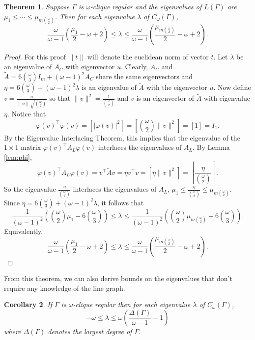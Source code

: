 \documentclass[12pt]{report}
\newtheorem{thm}{Theorem}[chapter]
\newtheorem{cor}[thm]{Corollary}
\theoremstyle{definition}
\begin{document}
\begin{thm} \label{thm:bounds}
    Suppose $\Gamma$ is $\omega$-clique regular and the eigenvalues of $L(\Gamma)$ are $\mu_1 \leq \cdots \leq \mu_{m\binom{\omega}{2}}$. Then for each eigenvalue $\lambda$ of $C_\omega(\Gamma)$,
    \[\frac{\omega}{\omega - 1}\left(\frac{\mu_1}{2} -\omega +2\right) \leq \lambda \leq \frac{\omega}{\omega - 1}\left(\frac{\mu_{m\binom{\omega}{2}}}{2} -\omega +2\right).\]
\end{thm}
\begin{proof}
    For this proof $\|t\|$ will denote the euclidean norm of vector $t$. Let $\lambda$ be an eigenvalue of $A_C$ with eigenvector $u$. Clearly, $A_C$ and $\tilde{A} = 6\binom{\omega}{3}I_{m} + (\omega -1)^2A_C$ share the same eigenvectors and $\eta= 6\binom{\omega}{3}+(\omega-1)^2\lambda$ is an eigenvalue of $\tilde{A}$ with the eigenvector $u$. Now define $v = \frac{u}{\|u\|\sqrt{\binom{\omega}{2}}}$ so that $\|v\|^2=\frac{1}{\binom{\omega}{2}}$ and $v$ is an eigenvector of $\tilde{A}$ with eigenvalue $\eta$. Notice that 
    \[\varphi(v)^\top \varphi(v)=\left[|\varphi(v)|^2\right]=\left[\binom{\omega}{2}\|v\|^2\right]=[1]=I_1.\]
    By the Eigenvalue Interlacing Theorem, \cite[pg. 26]{haemers} this implies that the eigenvalue of the $1 \times 1$ matrix $\varphi(v)^\top  A_L \varphi(v)$ interlaces the eigenvalues of $A_L$. By Lemma \ref{lem:phi}, 
    \[\varphi(v)^\top  A_L \varphi(v)  = v^\top  \tilde{A}v = \eta v^\top  v =\left[\eta\|v\|^2\right]=\left[\frac{\eta}{\binom{\omega}{2}}\right].\] So the eigenvalue $\frac{\eta}{\binom{\omega}{2}}$ interlaces the eigenvalues of $A_L$, $\mu_1 \leq \frac{\eta}{\binom{\omega}{2}} \leq \mu_{m\binom{\omega}{2}}$. \\Since $\eta=6\binom{\omega}{3}+(\omega - 1)^2\lambda$, it follows that
     \[\frac{1}{(\omega - 1)^2}\left(\binom{\omega}{2} \mu_1-6\binom{\omega}{3}\right) \leq \lambda \leq \frac{1}{(\omega - 1)^2}\left(\binom{\omega}{2} \mu_{m\binom{\omega}{2}}-6\binom{\omega}{3}\right).\]
    Equivalently,
    \[\frac{\omega}{\omega - 1}\left(\frac{\mu_1}{2} -\omega +2\right) \leq \lambda \leq \frac{\omega}{\omega - 1}\left(\frac{\mu_{m\binom{\omega}{2}}}{2} -\omega +2\right).\]
\end{proof}
From this theorem, we can also derive bounds on the eigenvalues that don't require any knowledge of the line graph.
\begin{cor} \label{cor:eigens}
    If $\Gamma$ is $\omega$-clique regular then for each eigenvalue $\lambda$ of $C_\omega(\Gamma)$, \[-\omega \leq \lambda \leq \omega\left(\frac{\Delta(\Gamma)}{\omega-1}-1\right)\] where $\Delta(\Gamma)$ denotes the largest degree of $\Gamma$.
\end{cor} 
\end{document}
